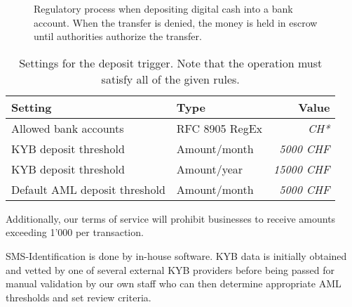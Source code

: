 \begin{figure}[h!]
\begin{center}
  \end{center}
  \caption{Regulatory process when depositing digital cash into a bank
    account.  When the transfer is denied, the money is held in escrow
    until authorities authorize the transfer.}
\end{figure}


\begin{table}[h!]
  \caption{Settings for the deposit trigger. Note that the operation
  must satisfy all of the given rules.}
  \begin{tabular}{l|l|r}
    {\bf Setting}                 & {\bf Type}         & {\bf Value}     \\ \hline \hline
    Allowed bank accounts         & RFC 8905 RegEx     & {\em CH*}       \\ \hline
    KYB deposit threshold         & Amount/month       & {\em  5000 CHF} \\
    KYB deposit threshold         & Amount/year        & {\em 15000 CHF} \\
    Default AML deposit threshold & Amount/month       & {\em  5000 CHF} \\
  \end{tabular}
\end{table}


Additionally, our terms of service will prohibit businesses to receive
amounts exceeding 1'000 \CURRENCY{} per transaction.

SMS-Identification is done by in-house software. KYB data is initially
obtained and vetted by one of several external KYB providers before
being passed for manual validation by our own staff who can then
determine appropriate AML thresholds and set review criteria.
